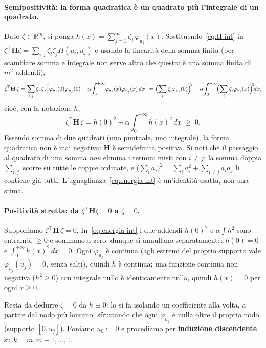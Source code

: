 \documentclass[11pt,a4paper]{article}
\theoremstyle{plain}
\theoremstyle{definition}
\theoremstyle{remark}
\newcommand{\Hmat}{\mathbf{H}}
\newcommand{\transp}{^{\!\top}}
\begin{document}
\paragraph{Semipositivit\`a: la forma quadratica \`e un quadrato pi\`u l'integrale di un
quadrato.} Dato $\zeta\in\mathbb{R}^m$, si ponga
$h(x) = \sum_{j=1}^m \zeta_j\,\varphi_{u_j}(x)$. Sostituendo~\eqref{eq:H-int} in
$\zeta\transp\Hmat\zeta=\sum_{i,j}\zeta_i\zeta_j H(u_i,u_j)$ e usando la linearit\`a della
somma finita (per scambiare somma e integrale non serve altro che questo: \`e una somma finita
di $m^2$ addendi),
\[
  \zeta\transp\Hmat\,\zeta
  = \sum_{i,j}\zeta_i\,\zeta_j\Bigl[\varphi_{u_i}(0)\varphi_{u_j}(0)
    + \alpha\!\int_0^{+\infty}\!\varphi_{u_i}(x)\varphi_{u_j}(x)\,dx\Bigr]
  = \Bigl(\sum_i \zeta_i\varphi_{u_i}(0)\Bigr)^{\!2}
    + \alpha\!\int_0^{+\infty}\!\Bigl(\sum_i \zeta_i\varphi_{u_i}(x)\Bigr)^{\!2}\!dx ,
\]
cio\`e, con la notazione $h$,
\begin{equation}
  \zeta\transp\Hmat\,\zeta
  = h(0)^2 + \alpha\!\int_0^{+\infty}\! h(x)^2\,dx \;\ge\; 0 .
  \label{eq:energia-int}
\end{equation}
Essendo somma di due quadrati (uno puntuale, uno integrale), la forma quadratica non \`e mai
negativa: $\Hmat$ \`e semidefinita positiva. Si noti che il passaggio al quadrato di una somma
\emph{non} elimina i termini misti con $i\neq j$: la somma doppia $\sum_{i,j}$ scorre su tutte
le coppie ordinate, e $\bigl(\sum_i a_i\bigr)^2 = \sum_i a_i^2 + \sum_{i\neq j}a_ia_j$ li
contiene gi\`a tutti. L'uguaglianza~\eqref{eq:energia-int} \`e un'identit\`a esatta, non una
stima.

\paragraph{Positivit\`a stretta: da $\zeta\transp\Hmat\zeta=0$ a $\zeta=0$.} Supponiamo
$\zeta\transp\Hmat\,\zeta=0$. In~\eqref{eq:energia-int} i due addendi $h(0)^2$ e
$\alpha\int h^2$ sono entrambi $\ge 0$ e sommano a zero, dunque si annullano separatamente:
$h(0)=0$ e $\int_0^{+\infty}h(x)^2\,dx=0$. Ogni $\varphi_{u_j}$ \`e continua (agli estremi del
proprio supporto vale $\varphi_{u_j}(u_j)=0$, senza salti), quindi $h$ \`e continua; una
funzione continua non negativa ($h^2\ge0$) con integrale nullo \`e identicamente nulla, quindi
$h(x)=0$ per ogni $x\ge 0$.

Resta da dedurre $\zeta=0$ da $h\equiv 0$: lo si fa isolando un coefficiente alla volta, a
partire dal nodo pi\`u lontano, sfruttando che ogni $\varphi_{u_j}$ \`e nulla oltre il proprio
nodo (supporto $[0,u_j]$). Poniamo $u_0:=0$ e procediamo per \textbf{induzione discendente}
su $k=m,m-1,\ldots,1$.
\end{document}
